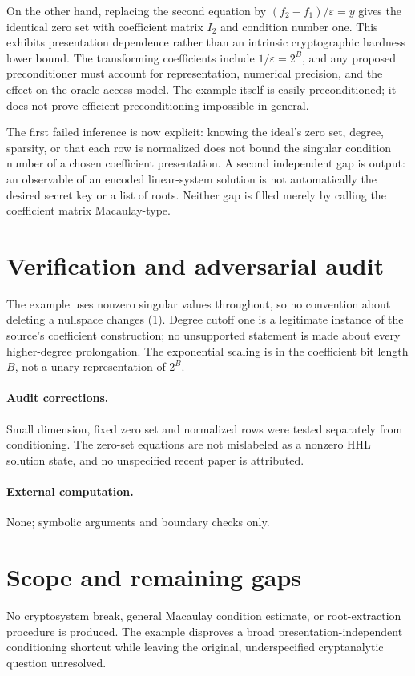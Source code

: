 \documentclass[11pt]{article}
\begin{document}
On the other hand, replacing the second equation by $(f_2-f_1)/\varepsilon=y$ gives the identical zero set with coefficient matrix $I_2$ and condition number one. This exhibits presentation dependence rather than an intrinsic cryptographic hardness lower bound. The transforming coefficients include $1/\varepsilon=2^B$, and any proposed preconditioner must account for representation, numerical precision, and the effect on the oracle access model. The example itself is easily preconditioned; it does not prove efficient preconditioning impossible in general.

The first failed inference is now explicit: knowing the ideal's zero set, degree, sparsity, or that each row is normalized does not bound the singular condition number of a chosen coefficient presentation. A second independent gap is output: an observable of an encoded linear-system solution is not automatically the desired secret key or a list of roots. Neither gap is filled merely by calling the coefficient matrix Macaulay-type.
\section{Verification and adversarial audit}
The example uses nonzero singular values throughout, so no convention about deleting a nullspace changes (1). Degree cutoff one is a legitimate instance of the source's coefficient construction; no unsupported statement is made about every higher-degree prolongation. The exponential scaling is in the coefficient bit length $B$, not a unary representation of $2^B$.
\paragraph{Audit corrections.} Small dimension, fixed zero set and normalized rows were tested separately from conditioning. The zero-set equations are not mislabeled as a nonzero HHL solution state, and no unspecified recent paper is attributed.
\paragraph{External computation.} None; symbolic arguments and boundary checks only.
\section{Scope and remaining gaps}
No cryptosystem break, general Macaulay condition estimate, or root-extraction procedure is produced. The example disproves a broad presentation-independent conditioning shortcut while leaving the original, underspecified cryptanalytic question unresolved.
\end{document}
